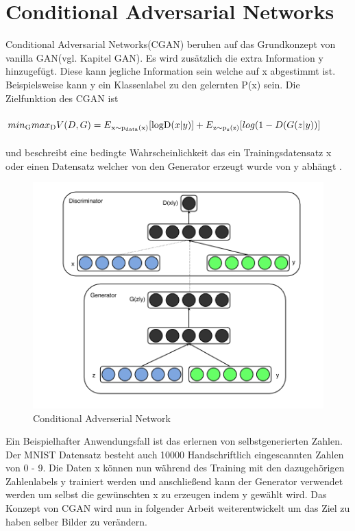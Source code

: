 \documentclass{llncs}
\begin{document}
\section{Conditional Adversarial Networks}

Conditional Adversarial Networks(CGAN) beruhen auf das Grundkonzept von vanilla GAN(vgl. Kapitel GAN). Es wird zusätzlich die extra Information y hinzugefügt. Diese kann jegliche Information sein welche auf x abgestimmt ist. Beispielsweise kann y ein Klassenlabel zu den gelernten P(x) sein. Die Zielfunktion des CGAN ist
\\\\
\begin{math}
min\textsubscript{G} max\textsubscript{D}V(D,G)=E\textsubscript{x$\sim$p\textsubscript{data}(x)}[\log $D$(x|y)]  + E\textsubscript{z$\sim$p\textsubscript{z}(z)}[log(1-D(G(z|y))]           
\end{math}
\\\\    
und beschreibt eine  bedingte Wahrscheinlichkeit das ein Trainingsdatensatz x oder einen Datensatz welcher von den Generator erzeugt wurde von y abhängt \cite{cgan}. 
\begin{figure}[htbp] 
	\centering
	\includegraphics[width=1.0\textwidth]{cgan.png}
	\caption{Conditional Adverserial Network}
	\label{fig:Bild8}
\end{figure}

Ein Beispielhafter Anwendungsfall ist das erlernen von selbstgenerierten Zahlen. Der MNIST Datensatz besteht auch 10000 Handschriftlich eingescannten Zahlen von 0 - 9. Die Daten x können nun während des Training mit den dazugehörigen Zahlenlabels y trainiert werden und anschließend kann der Generator verwendet werden um selbst die gewünschten x zu erzeugen indem y gewählt wird\cite{cgan}. Das Konzept von CGAN wird nun in folgender Arbeit weiterentwickelt um das Ziel zu haben selber Bilder zu verändern. 
\end{document}
